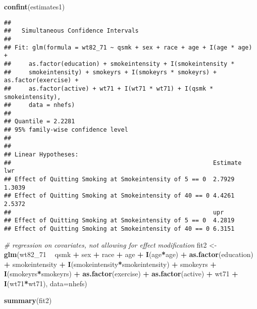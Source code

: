 \documentclass[10pt,]{book}
\newenvironment{Shaded}{\begin{snugshade}}{\end{snugshade}}
\newcommand{\CommentTok}[1]{\textcolor[rgb]{0.56,0.35,0.01}{\textit{#1}}}
\newcommand{\DataTypeTok}[1]{\textcolor[rgb]{0.13,0.29,0.53}{#1}}
\newcommand{\DecValTok}[1]{\textcolor[rgb]{0.00,0.00,0.81}{#1}}
\newcommand{\KeywordTok}[1]{\textcolor[rgb]{0.13,0.29,0.53}{\textbf{#1}}}
\newcommand{\NormalTok}[1]{#1}
\newcommand{\OperatorTok}[1]{\textcolor[rgb]{0.81,0.36,0.00}{\textbf{#1}}}
\newcommand{\StringTok}[1]{\textcolor[rgb]{0.31,0.60,0.02}{#1}}
\begin{document}
\begin{Shaded}
\begin{Highlighting}[]
  \KeywordTok{confint}\NormalTok{(estimates1)}
\end{Highlighting}
\end{Shaded}

\begin{verbatim}
## 
##   Simultaneous Confidence Intervals
## 
## Fit: glm(formula = wt82_71 ~ qsmk + sex + race + age + I(age * age) + 
##     as.factor(education) + smokeintensity + I(smokeintensity * 
##     smokeintensity) + smokeyrs + I(smokeyrs * smokeyrs) + as.factor(exercise) + 
##     as.factor(active) + wt71 + I(wt71 * wt71) + I(qsmk * smokeintensity), 
##     data = nhefs)
## 
## Quantile = 2.2281
## 95% family-wise confidence level
##  
## 
## Linear Hypotheses:
##                                                         Estimate lwr   
## Effect of Quitting Smoking at Smokeintensity of 5 == 0  2.7929   1.3039
## Effect of Quitting Smoking at Smokeintensity of 40 == 0 4.4261   2.5372
##                                                         upr   
## Effect of Quitting Smoking at Smokeintensity of 5 == 0  4.2819
## Effect of Quitting Smoking at Smokeintensity of 40 == 0 6.3151
\end{verbatim}

\begin{Shaded}
\begin{Highlighting}[]
\CommentTok{# regression on covariates, not allowing for effect modification}
\NormalTok{fit2 <-}\StringTok{ }\KeywordTok{glm}\NormalTok{(wt82_}\DecValTok{71} \OperatorTok{~}\StringTok{ }\NormalTok{qsmk }\OperatorTok{+}\StringTok{ }\NormalTok{sex }\OperatorTok{+}\StringTok{ }\NormalTok{race }\OperatorTok{+}\StringTok{ }\NormalTok{age }\OperatorTok{+}\StringTok{ }\KeywordTok{I}\NormalTok{(age}\OperatorTok{*}\NormalTok{age) }\OperatorTok{+}\StringTok{ }\KeywordTok{as.factor}\NormalTok{(education)}
           \OperatorTok{+}\StringTok{ }\NormalTok{smokeintensity }\OperatorTok{+}\StringTok{ }\KeywordTok{I}\NormalTok{(smokeintensity}\OperatorTok{*}\NormalTok{smokeintensity) }\OperatorTok{+}\StringTok{ }\NormalTok{smokeyrs}
           \OperatorTok{+}\StringTok{ }\KeywordTok{I}\NormalTok{(smokeyrs}\OperatorTok{*}\NormalTok{smokeyrs) }\OperatorTok{+}\StringTok{ }\KeywordTok{as.factor}\NormalTok{(exercise) }\OperatorTok{+}\StringTok{ }\KeywordTok{as.factor}\NormalTok{(active)}
           \OperatorTok{+}\StringTok{ }\NormalTok{wt71 }\OperatorTok{+}\StringTok{ }\KeywordTok{I}\NormalTok{(wt71}\OperatorTok{*}\NormalTok{wt71), }\DataTypeTok{data=}\NormalTok{nhefs)}
  
\KeywordTok{summary}\NormalTok{(fit2)}
\end{Highlighting}
\end{Shaded}
\end{document}
